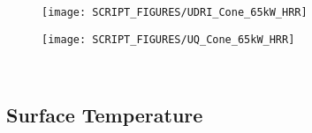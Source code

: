 \begin{landscape}
\begin{minipage}{0.65\textwidth}
\begin{figure}[H]
{\texttt{[image: SCRIPT\_FIGURES/UDRI\_Cone\_65kW\_HRR]}}\\
\end{figure}
\end{minipage}
\begin{minipage}{0.35\textwidth}
\begin{figure}[H]
{\texttt{[image: SCRIPT\_FIGURES/UQ\_Cone\_65kW\_HRR]}}\\
\end{figure}
\end{minipage}\\
\vfill 

\newpage
\subsection{Surface Temperature}
\label{Cone_Temp}

\end{landscape}
